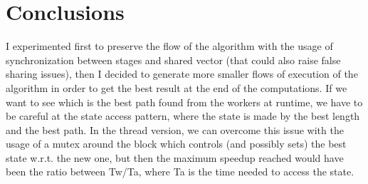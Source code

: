 \documentclass{article}
\begin{document}
    \section{Conclusions}
	I experimented first to preserve the flow of the algorithm with the usage of synchronization between stages and shared vector (that could also raise false sharing issues), then I decided to generate more smaller flows of execution of the algorithm in order to get the best result at the end of the computations. If we want to see which is the best path found from the workers at runtime, we have to be careful at the state access pattern, where the state is made by the best length and the best path. In the thread version, we can overcome this issue with the usage of a mutex around the block which controls (and possibly sets) the best state w.r.t. the new one, but then the maximum speedup reached would have been the ratio between Tw/Ta, where Ta is the time needed to access the state.
\end{document}
